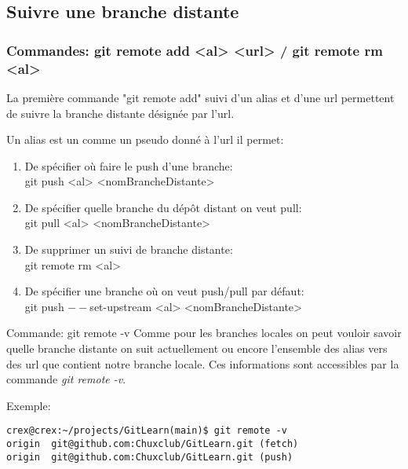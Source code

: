 \documentclass{beamer}
\begin{document}
\subsection{Suivre une branche distante}
\begin{frame}
\frametitle{Commandes: git remote add <al> <url> / git remote rm <al>}
La première commande "git remote add" suivi d'un alias et d'une url permettent de suivre la branche distante désignée par l'url.\\
\smallskip

Un alias est un comme un pseudo donné à l'url il permet:
\begin{enumerate}
    \item De spécifier où faire le push d'une branche:\\ git push <al> <nomBrancheDistante>
    \item De spécifier quelle branche du dépôt distant on veut pull:\\ git pull <al> <nomBrancheDistante>
    \item De supprimer un suivi de branche distante:\\ git remote rm <al>
    \item De spécifier une branche où on veut push/pull par défaut:\\ git push $--$set-upstream <al> <nomBrancheDistante>
\end{enumerate}
\end{frame}

\begin{frame}[fragile]{Commande: git remote -v}
Comme pour les branches locales on peut vouloir savoir quelle branche distante on suit actuellement ou encore l'ensemble des alias vers des url que contient notre branche locale. Ces informations sont accessibles par la commande \textit{git remote -v}.
\medskip

Exemple:
\begin{mdframed}[style=Bash]
\begin{lstlisting}[style=Bash, caption=Exemple d'output de la commande git remote -v]
crex@crex:~/projects/GitLearn(main)$ git remote -v
origin	git@github.com:Chuxclub/GitLearn.git (fetch)
origin	git@github.com:Chuxclub/GitLearn.git (push)
\end{lstlisting}
\end{mdframed}

\end{frame}



\end{document}
